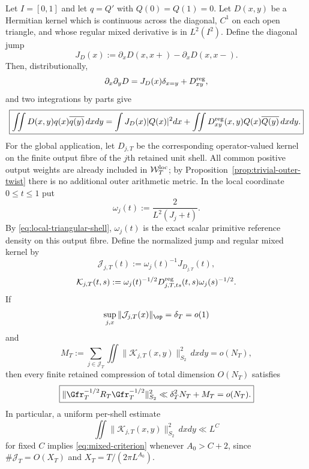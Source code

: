 \begin{lemma}
\label{lem:two-variable-primitive}
Let $I=[0,1]$ and let $q=Q'$ with $Q(0)=Q(1)=0$. Let $D(x,y)$ be a Hermitian
kernel which is continuous across the diagonal, $C^1$ on each open triangle,
and whose regular mixed derivative is in $L^2(I^2)$. Define the diagonal jump
\[
J_D(x):=\partial_xD(x,x+)-\partial_xD(x,x-).
\]
Then, distributionally,
\[
\partial_x\partial_yD
=J_D(x)\delta_{x=y}+D_{xy}^{\rm reg},
\]
and two integrations by parts give
\begin{equation}
\boxed{
\iint D(x,y)q(x)\overline{q(y)}\,dxdy
=\int J_D(x)|Q(x)|^2dx
+\iint D_{xy}^{\rm reg}(x,y)Q(x)\overline{Q(y)}\,dxdy.
}
\label{eq:two-variable-primitive}
\end{equation}
For the global application, let $D_{j,T}$ be the corresponding
operator-valued kernel on the finite output fibre of the $j$th retained unit
shell. All common positive output weights are already included in
$\mathcal W_T^{\rm loc}$; by Proposition~\ref{prop:trivial-outer-twist} there is
no additional outer arithmetic metric. In the local coordinate $0\le t\le1$
put
\begin{equation}
\omega_j(t):=\frac{2}{L^2(J_j+t)}.
\label{eq:local-primitive-weight}
\end{equation}
By \eqref{eq:local-triangular-shell}, $\omega_j(t)$ is the exact scalar
primitive reference density on this output fibre. Define the normalized jump
and regular mixed kernel by
\[
\mathcal J_{j,T}(t)
:=\omega_j(t)^{-1}J_{D_{j,T}}(t),
\]
\[
\mathcal K_{j,T}(t,s)
:=\omega_j(t)^{-1/2}D_{j,T,ts}^{\rm reg}(t,s)
\omega_j(s)^{-1/2}.
\]
If
\begin{equation}
\sup_{j,x}\|\mathcal J_{j,T}(x)\|_{\op}
=\delta_T=o(1)
\label{eq:jump-criterion}
\end{equation}
and
\begin{equation}
M_T:=\sum_{j\in\mathcal J_T}\iint
\|\mathcal K_{j,T}(x,y)\|_{S_2}^2\,dxdy=o(N_T),
\label{eq:mixed-criterion}
\end{equation}
then every finite retained compression of total dimension $O(N_T)$ satisfies
\begin{equation}
\boxed{
\|\Gfr_T^{-1/2}R_T\Gfr_T^{-1/2}\|_{S_2}^2
\ll \delta_T^2N_T+M_T=o(N_T).
}
\label{eq:primitive-HS-criterion}
\end{equation}
In particular, a uniform per-shell estimate
\[
\iint\|\mathcal K_{j,T}(x,y)\|_{S_2}^2\,dxdy\ll L^C
\]
for fixed $C$ implies \eqref{eq:mixed-criterion} whenever
$A_0>C+2$, since $\#\mathcal J_T=O(X_T)$ and
$X_T=T/(2\pi L^{A_0})$.
\end{lemma}

